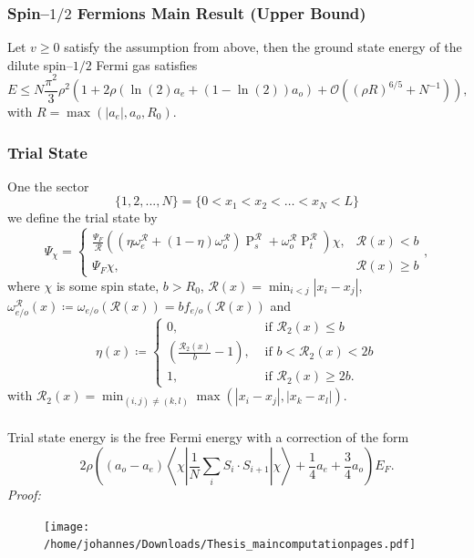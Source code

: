 \documentclass{beamer}[10]
\newcommand{\abs}[1]{\left\lvert #1 \right\rvert}
\renewcommand{\braket}[1]{\left\langle#1\right\rangle}
\begin{document}
\begin{frame}
	\frametitle{Spin--$1/2$ Fermions Main Result (Upper Bound)}
	\begin{block}{}
		\small
		\begin{theorem}\label{TheoremUpperBoundSpin1/2Fermi}
			Let $ v\geq0 $ satisfy the assumption from above, then the ground state energy of the dilute spin--$ 1/2 $ Fermi gas satisfies\begin{equation}\label{EqUpperBoundSpin1/2Fermi}
				E\leq N\frac{\pi^2}{3}\rho^2\left(1+2\rho \left(\ln(2) a_e+(1-\ln(2))a_o\right)+\mathcal{O}\left((\rho R)^{6/5}+N^{-1}\right)\right),
			\end{equation}
			with $ R=\max(\abs{a_e}, a_o, R_0) $.
		\end{theorem}
	\end{block}	
\end{frame}

\begin{frame}
	\frametitle{Trial State}
	\small One the sector
	$$ \{1,2,...,N\}=\{0<x_{1}<x_{2}<\ldots<x_{N}<L\} $$
	we define the trial state by 
	\begin{equation}\label{EqTrial StateSpin1/2Fermi}
		\Psi_\chi=\begin{cases}
			\frac{\Psi_F}{\mathcal{R}}\left(\left(\eta\omega^{\mathcal{R}}_e+(1-\eta)\omega^{\mathcal{R}}_o\right)\operatorname{P}_s^{\mathcal{R}}+\omega_o^{\mathcal{R}}\operatorname{P}_t^{\mathcal{R}}\right)\chi,&\mathcal{R}(x)<b\\
			\Psi_F\chi ,&\mathcal{R}(x)\geq b
		\end{cases},
	\end{equation}
where $ \chi $ is some spin state, $ b>R_0 $, $ \mathcal{R}(x)=\min_{i<j}\abs{x_i-x_j} $, $ \omega^\mathcal{R}_{e/o}(x)\coloneqq \omega_{e/o}(\mathcal{R}(x))=bf_{e/o}(\mathcal{R}(x)) $ and 
\begin{equation}
	\eta(x)\coloneqq\begin{cases}
		0,&\text{ if } \mathcal{R}_2(x)\leq b\\
		\left(\frac{\mathcal{R}_2(x)}{b}-1\right), &\text{ if } b<\mathcal{R}_2(x)<2b\\
		1, &\text{ if } \mathcal{R}_2(x)\geq 2b.
	\end{cases}
\end{equation}
with $ \mathcal{R}_2(x)=\min_{(i,j)\neq (k,l)}\max(\abs{x_i-x_j},\abs{x_k-x_l}) $.
\end{frame}

\begin{frame}
	\frametitle{}
	\vspace*{1cm}
		\small Trial state energy is the free Fermi energy with a correction of the form
	$$
	2\rho\left( (a_o-a_e) \braket{\chi \left\vert \frac{1}{N}\sum_{i}S_i\cdot S_{i+1} \right\vert \chi} +\frac{1}{4}a_e+\frac{3}{4}a_o \right)E_F.
	$$ 
	\emph{Proof:}\vspace*{-0.1cm}
	\begin{figure}[h!]
		\texttt{[image: /home/johannes/Downloads/Thesis\_maincomputationpages.pdf]}
	\end{figure}
\end{frame}
\end{document}
